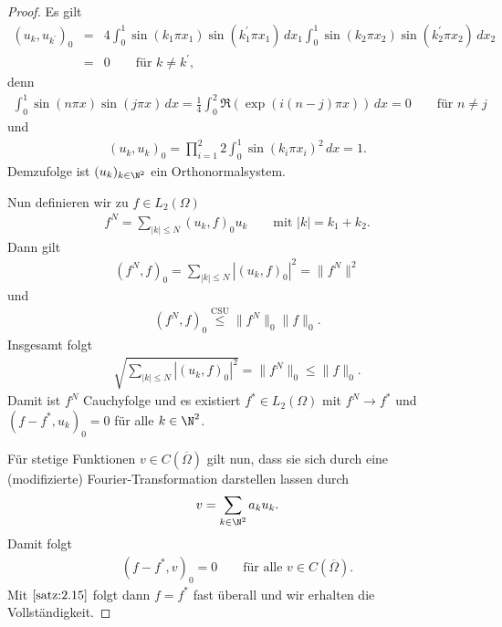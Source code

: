 \begin{proof}
    Es gilt
    \begin{eqnarray*}
            (u_k, u_{k^\prime})_0
        &=& 4 \int_0^1 \sin(k_1 \pi x_1)
            \sin(k_1^\prime \pi x_1) \,dx_1 \int_0^1 \sin(k_2 \pi x_2)
            \sin(k_2^\prime \pi x_2) \,dx_2 \\
        &=& 0 \qquad \text{für } k \not = k^\prime,
    \end{eqnarray*}
    denn
    \begin{eqnarray*}
        \int_0^1 \sin(n \pi x) \sin(j \pi x) \,dx = \frac{1}{4} \int_0^2
        \Re(\exp(i (n - j) \pi x)) \,dx = 0 \qquad \text{für } n \not = j
    \end{eqnarray*}
    und
    \begin{eqnarray*}
          (u_k, u_k)_0
        = \prod_{i=1}^2 2 \int_0^1 \sin(k_i \pi x_i)^2 \,dx = 1.
    \end{eqnarray*}
    Demzufolge ist $(u_k)_{k\in\N^2}$ ein Orthonormalsystem.

    Nun definieren wir zu $f \in L_2(\Omega)$
    \begin{eqnarray*}
        f^N = \sum_{|k|\le N} (u_k, f)_0 u_k \qquad \text{mit } |k| = k_1 + k_2.
    \end{eqnarray*}
    Dann gilt
    \begin{eqnarray*}
        (f^N, f)_0 = \sum_{|k|\le N} |(u_k, f)_0|^2 = \|f^N\|^2 
    \end{eqnarray*}
    und
    \begin{eqnarray*}
        (f^N, f)_0 \stackrel{\text{CSU}}\le \|f^N\|_0 \|f\|_0.
    \end{eqnarray*}
    Insgesamt folgt
    \begin{eqnarray*}
        \sqrt{\sum_{|k|\le N} |(u_k, f)_0|^2} = \|f^N\|_0 \le \|f\|_0.
    \end{eqnarray*}
    Damit ist $f^N$ Cauchyfolge und es existiert $f^* \in L_2(\Omega)$ mit
    $f^N \to f^*$ und $(f - f^*, u_k)_0 = 0$ für
    alle $k \in \N^2$.

    Für stetige Funktionen $v \in C(\overline\Omega)$ gilt nun,
    dass sie sich durch eine (modifizierte) Fourier-Transformation darstellen
    lassen durch
    \begin{eqnarray*}
        v = \sum_{k\in\N^2} a_k u_k.
    \end{eqnarray*}
    Damit folgt
    \begin{eqnarray*}
        (f - f^*, v)_0 = 0 \qquad \text{für alle } v\in C(\overline\Omega).
    \end{eqnarray*}
    Mit $\eqref{satz:2.15}$ folgt dann $f = f^*$ fast überall und wir erhalten
    die Vollständigkeit.
\end{proof}


